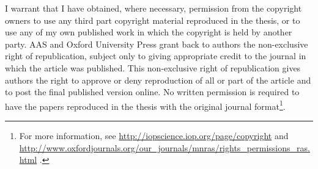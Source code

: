 I warrant that I have obtained, where necessary, permission from the copyright owners to use 
any third part copyright material reproduced in the thesis, 
or to use any of my own published work in which the copyright 
is held by another party. 
AAS and Oxford University Press grant back to authors the non-exclusive right of republication, 
subject only to giving appropriate credit to the journal in which the article was published. 
This non-exclusive right of republication gives authors the right to approve or deny 
reproduction of all or part of the article and to post the final published version online.  
No written permission is required to have the papers reproduced in the thesis with the original journal 
format\footnote{For more information, see 
\url{http://iopscience.iop.org/page/copyright} and 
\url{http://www.oxfordjournals.org/our_journals/mnras/rights_permissions_ras.html} .}. 

